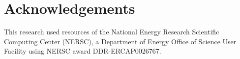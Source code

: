 \section*{Acknowledgements}
\label{sec:acknowledgements}

This research used resources of the National Energy Research Scientific Computing Center (NERSC), a Department of Energy Office of Science User Facility using NERSC award DDR-ERCAP0026767.